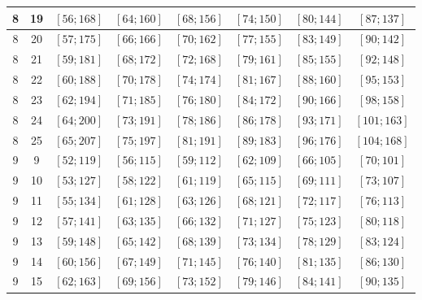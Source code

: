 \documentclass[a4paper,12pt]{article}
\begin{document}
\begin{center}
{\begin{longtable}[H]{|c|c|c|c|c|c|c|c|}
8 &  19 &  $\left[ 56; 168\right]$ &  $\left[ 64; 160\right]$ &  $\left[ 68; 156\right]$ &  $\left[ 74; 150\right]$ &  $\left[ 80; 144\right]$ &  $\left[ 87; 137\right]$ \tabularnewline \hline
8 &  20 &  $\left[ 57; 175\right]$ &  $\left[ 66; 166\right]$ &  $\left[ 70; 162\right]$ &  $\left[ 77; 155\right]$ &  $\left[ 83; 149\right]$ &  $\left[ 90; 142\right]$ \tabularnewline \hline
8 &  21 &  $\left[ 59; 181\right]$ &  $\left[ 68; 172\right]$ &  $\left[ 72; 168\right]$ &  $\left[ 79; 161\right]$ &  $\left[ 85; 155\right]$ &  $\left[ 92; 148\right]$ \tabularnewline \hline
8 &  22 &  $\left[ 60; 188\right]$ &  $\left[ 70; 178\right]$ &  $\left[ 74; 174\right]$ &  $\left[ 81; 167\right]$ &  $\left[ 88; 160\right]$ &  $\left[ 95; 153\right]$ \tabularnewline \hline
8 &  23 &  $\left[ 62; 194\right]$ &  $\left[ 71; 185\right]$ &  $\left[ 76; 180\right]$ &  $\left[ 84; 172\right]$ &  $\left[ 90; 166\right]$ &  $\left[ 98; 158\right]$ \tabularnewline \hline
8 &  24 &  $\left[ 64; 200\right]$ &  $\left[ 73; 191\right]$ &  $\left[ 78; 186\right]$ &  $\left[ 86; 178\right]$ &  $\left[ 93; 171\right]$ &  $\left[ 101; 163\right]$ \tabularnewline \hline
8 &  25 &  $\left[ 65; 207\right]$ &  $\left[ 75; 197\right]$ &  $\left[ 81; 191\right]$ &  $\left[ 89; 183\right]$ &  $\left[ 96; 176\right]$ &  $\left[ 104; 168\right]$ \tabularnewline \hline
9 &  9 &  $\left[ 52; 119\right]$ &  $\left[ 56; 115\right]$ &  $\left[ 59; 112\right]$ &  $\left[ 62; 109\right]$ &  $\left[ 66; 105\right]$ &  $\left[ 70; 101\right]$ \tabularnewline \hline
9 &  10 &  $\left[ 53; 127\right]$ &  $\left[ 58; 122\right]$ &  $\left[ 61; 119\right]$ &  $\left[ 65; 115\right]$ &  $\left[ 69; 111\right]$ &  $\left[ 73; 107\right]$ \tabularnewline \hline
9 &  11 &  $\left[ 55; 134\right]$ &  $\left[ 61; 128\right]$ &  $\left[ 63; 126\right]$ &  $\left[ 68; 121\right]$ &  $\left[ 72; 117\right]$ &  $\left[ 76; 113\right]$ \tabularnewline \hline
9 &  12 &  $\left[ 57; 141\right]$ &  $\left[ 63; 135\right]$ &  $\left[ 66; 132\right]$ &  $\left[ 71; 127\right]$ &  $\left[ 75; 123\right]$ &  $\left[ 80; 118\right]$ \tabularnewline \hline
9 &  13 &  $\left[ 59; 148\right]$ &  $\left[ 65; 142\right]$ &  $\left[ 68; 139\right]$ &  $\left[ 73; 134\right]$ &  $\left[ 78; 129\right]$ &  $\left[ 83; 124\right]$ \tabularnewline \hline
9 &  14 &  $\left[ 60; 156\right]$ &  $\left[ 67; 149\right]$ &  $\left[ 71; 145\right]$ &  $\left[ 76; 140\right]$ &  $\left[ 81; 135\right]$ &  $\left[ 86; 130\right]$ \tabularnewline \hline
9 &  15 &  $\left[ 62; 163\right]$ &  $\left[ 69; 156\right]$ &  $\left[ 73; 152\right]$ &  $\left[ 79; 146\right]$ &  $\left[ 84; 141\right]$ &  $\left[ 90; 135\right]$ \tabularnewline \hline

\end{longtable}}
\end{center}
\end{document}
